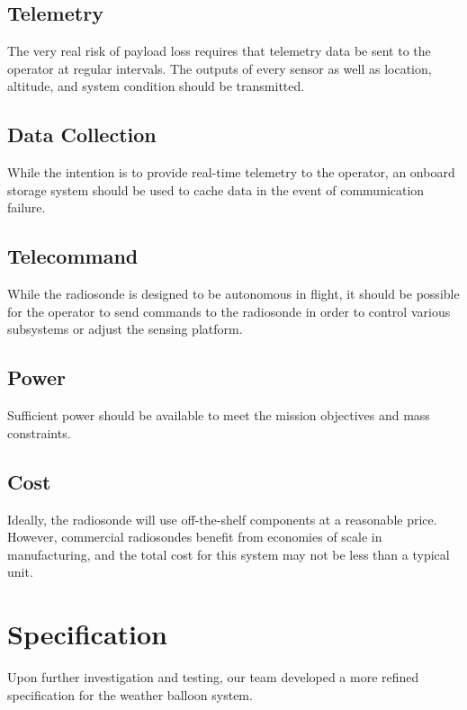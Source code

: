 \documentclass[conference,compsoc]{IEEEtran}
\begin{document}
\subsection{Telemetry}
The very real risk of payload loss requires that telemetry data be sent to the operator at regular intervals. The outputs of every sensor as well as location, altitude, and system condition should be transmitted.

\subsection{Data Collection}
While the intention is to provide real-time telemetry to the operator, an onboard storage system should be used to cache data in the event of communication failure.  

\subsection{Telecommand}
While the radiosonde is designed to be autonomous in flight, it should be possible for the operator to send commands to the radiosonde in order to control various subsystems or adjust the sensing platform.

\subsection{Power}
Sufficient power should be available to meet the mission objectives and mass constraints.

\subsection{Cost}
Ideally, the radiosonde will use off-the-shelf components at a reasonable price.  However, commercial radiosondes benefit from economies of scale in manufacturing, and the total cost for this system may not be less than a typical unit.

\section{Specification}
Upon further investigation and testing, our team developed a more refined specification for the weather balloon system.
\end{document}
